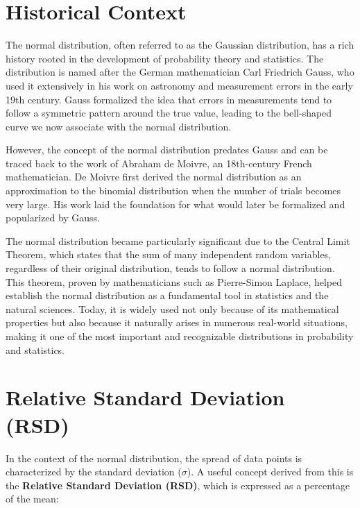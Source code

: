 \documentclass[
  12 pt,
  a4paper,
]{book}
\numberwithin{equation}{section}
\theoremstyle{plain}      %
\theoremstyle{definition} %
\theoremstyle{remark}     %
\theoremstyle{note}         %
\begin{document}
\hypertarget{historical-context}{%
\section{Historical Context}\label{historical-context}}

The normal distribution, often referred to as the Gaussian distribution,
has a rich history rooted in the development of probability theory and
statistics. The distribution is named after the German mathematician
Carl Friedrich Gauss, who used it extensively in his work on astronomy
and measurement errors in the early 19th century. Gauss formalized the
idea that errors in measurements tend to follow a symmetric pattern
around the true value, leading to the bell-shaped curve we now associate
with the normal distribution.

However, the concept of the normal distribution predates Gauss and can
be traced back to the work of Abraham de Moivre, an 18th-century French
mathematician. De Moivre first derived the normal distribution as an
approximation to the binomial distribution when the number of trials
becomes very large. His work laid the foundation for what would later be
formalized and popularized by Gauss.

The normal distribution became particularly significant due to the
Central Limit Theorem, which states that the sum of many independent
random variables, regardless of their original distribution, tends to
follow a normal distribution. This theorem, proven by mathematicians
such as Pierre-Simon Laplace, helped establish the normal distribution
as a fundamental tool in statistics and the natural sciences. Today, it
is widely used not only because of its mathematical properties but also
because it naturally arises in numerous real-world situations, making it
one of the most important and recognizable distributions in probability
and statistics.

\hypertarget{relative-standard-deviation-rsd}{%
\section{Relative Standard Deviation
(RSD)}\label{relative-standard-deviation-rsd}}

In the context of the normal distribution, the spread of data points is
characterized by the standard deviation (\(\sigma\)). A useful concept
derived from this is the \textbf{Relative Standard Deviation (RSD)},
which is expressed as a percentage of the mean:
\end{document}
